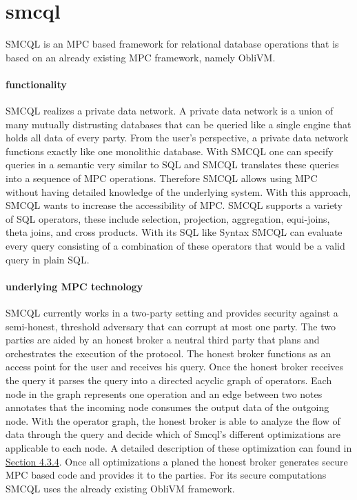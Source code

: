 \section{smcql}
SMCQL is an MPC based framework for relational database operations that is based on an already existing MPC framework, namely ObliVM. 
\paragraph{functionality}
SMCQL realizes a private data network. A private data network is a union of many mutually distrusting databases that can be queried like a single engine that holds all data of every party. From the user's perspective, a private data network functions exactly like one monolithic database. With SMCQL one can specify queries in a semantic very similar to SQL and SMCQL translates these queries into a sequence of MPC operations. Therefore SMCQL allows using MPC without having detailed knowledge of the underlying system. With this approach, SMCQL wants to increase the accessibility of MPC. SMCQL supports a variety of SQL operators, these include selection, projection, aggregation, equi-joins, theta joins, and cross products. With its SQL like Syntax SMCQL can evaluate every query consisting of a combination of these operators that would be a valid query in plain SQL.  


\paragraph{underlying MPC technology}
SMCQL currently works in a two-party setting and provides security against a semi-honest, threshold adversary that can corrupt at most one party. The two parties are aided by an honest broker a neutral third party that plans and orchestrates the execution of the protocol.
The honest broker functions as an access point for the user and receives his query.
Once the honest broker receives the query it parses the query into a directed acyclic graph of operators. Each node in the graph represents one operation and an edge between two notes annotates that the incoming node consumes the output data of the outgoing node. 
With the operator graph, the honest broker is able to analyze the flow of data through the query and decide which of Smcql's different optimizations are applicable to each node. 
A detailed description of these optimization can found in \hyperref[sec:Optimizations_smcql]{Section 4.3.4}. Once all optimizations a planed the honest broker generates secure MPC based code and provides it to the parties. For its secure computations SMCQL uses the already existing ObliVM framework.
